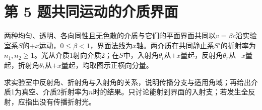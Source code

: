 \documentclass[UTF8,fontset=fandol,a4paper,11pt]{ctexart}
\begin{document}


\section*{第 5 题\quad 共同运动的介质界面}\label{q:5}

两种均匀、透明、各向同性且无色散的介质与它们的平面界面共同以$v=\beta c$沿实验室系$S$的$+x$运动，$0\le\beta<1$，界面法线为$x$轴。两介质在共同静止系$S'$的折射率为$n_1,n_2\ge1$。光从介质1射向介质2；在$S$中，入射角$\theta_i$从$+x$量起，反射角$\theta_r$从$-x$量起，折射角$\theta_t$从$+x$量起，均取图示正横向分量。

求实验室中反射角、折射角与入射角的关系，说明传播分支与适用角域；再给出介质1为真空、介质2折射率为$n$时的结果。只讨论能射到界面的入射支；若发生全反射，应指出没有传播折射光。
\end{document}
